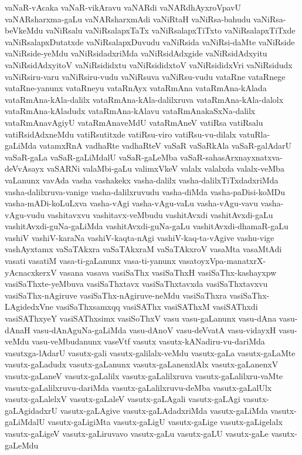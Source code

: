 {vaNaR-vAcaka
vaNaR-vikAravu
vaNARdi
vaNARdhAyxroVpavU
vaNARsharxma-gaLu
vaNARsharxmAdi
vaNiRtaH
vaNiRsa-bahudu
vaNiRsa-beVkeMdu
vaNiRsalu
vaNiRsalapxTaTx
vaNiRsalapxTiTxto
vaNiRsalapxTiTxde
vaNiRsalapxDutatxde
vaNiRsalapxDuvudu
vaNiRsida
vaNiRsi-daMte
vaNiRside
vaNiRside-yeMdu
vaNiRsidadxriMda
vaNiRsidAdxgide
vaNiRsidAdxyitu
vaNiRsidAdxyitoV
vaNiRsididxtu
vaNiRsididxtoV
vaNiRsididxVri
vaNiRsidudx
vaNiRsiru-varu
vaNiRsiru-vudu
vaNiRsuva
vaNiRsu-vudu
vataRne
vataRnege
vataRne-yanunx
vataRneyu
vataRnAyx
vataRmAna
vataRmAna-kAlada
vataRmAna-kAla-dalilx
vataRmAna-kAla-dalilxruva
vataRmAna-kAla-dalolx
vataRmAna-kAladudx
vataRmAna-kAlavu
vataRmAnakaSxNa-dalilx
vataRmAnavAgiyU
vataRmAnaveMdU
vataRmAneV
vatiRsa
vatiRsalu
vatiRsidAdxneMdu
vatiRsutitxde
vatiRsu-viro
vatiRsu-vu-dilalx
vatuRla-gaLiMda
vatamxRnA
vadhaRte
vadhaRteV
vaSaR
vaSaRkAla
vaSaR-galAdarU
vaSaR-gaLa
vaSaR-gaLiMdalU
vaSaR-gaLeMba
vaSaR-sahasArxnayxnatxva-deVvAsayx
vaSARNi
valaMbi-gaLu
valimxVkeV
valalx
valalxda
valalx-veMba
vaLanunx
vavAda
vasha
vashakekx
vasha-dalilx
vasha-dalilxTiTxdadxriMda
vasha-dalilxruva-vanige
vasha-dalilxruvudu
vasha-diMda
vasha-paDisi-koMDu
vasha-mADi-koLuLxva
vasha-vAgi
vasha-vAgu-vaLu
vasha-vAgu-vavu
vasha-vAgu-vudu
vashitavxvu
vashitavx-veMbudu
vashitAvxdi
vashitAvxdi-gaLu
vashitAvxdi-guNa-gaLiMda
vashitAvxdi-guNa-gaLu
vashitAvxdi-dhamaR-gaLu
vashiV
vashiV-karaNa
vashiV-kaqta-nAgi
vashiV-kaq-ta-vAgive
vashu-vige
vashAyxtamx
vaSaTAkxra
vaSaTAkxraM
vaSaTAkxroV
vasaMta
vasaMtAdi
vasati
vasatiM
vasa-ti-gaLanunx
vasa-ti-yanunx
vasatoyxVpa-manatxrX-yAcnacxkerxV
vasana
vasava
vasiSaThx
vasiSaThxH
vasiSaThx-kashayxpw
vasiSaThxte-yeMbuva
vasiSaThxtavx
vasiSaThxtavxda
vasiSaThxtavxvu
vasiSaThx-nAgiruve
vasiSaThx-nAgiruve-neMdu
vasiSaThxra
vasiSaThx-LAgidedxVne
vasiSaThxsamxqq
vasiSAThx
vasiSAThxM
vasiSAThxdi
vasiSAThxyeY
vasiSAThxsimx
vasiSoThxV
vasu
vasu-gaLanunx
vasu-dAna
vasu-dAnaH
vasu-dAnAguNa-gaLiMda
vasu-dAnoV
vasu-deVvatA
vasu-vidayxH
vasu-veMdu
vasu-veMbudanunx
vaseVtf
vasutx
vasutx-kANadiru-vu-dariMda
vasutxga-lAdarU
vasutx-gali
vasutx-galilalx-veMdu
vasutx-gaLa
vasutx-gaLaMte
vasutx-gaLadudx
vasutx-gaLanunx
vasutx-gaLanenxlAlx
vasutx-gaLanenxV
vasutx-gaLaneV
vasutx-gaLalilx
vasutx-gaLalilxruva
vasutx-gaLalilxru-vaMte
vasutx-gaLalilxruvu-dariMda
vasutx-gaLalilxruvu-deMba
vasutx-gaLalUlx
vasutx-gaLalelxV
vasutx-gaLaleV
vasutx-gaLAgali
vasutx-gaLAgi
vasutx-gaLAgidadxrU
vasutx-gaLAgive
vasutx-gaLAdadxriMda
vasutx-gaLiMda
vasutx-gaLiMdalU
vasutx-gaLigiMta
vasutx-gaLigU
vasutx-gaLige
vasutx-gaLigelalx
vasutx-gaLigeV
vasutx-gaLiruvavo
vasutx-gaLu
vasutx-gaLU
vasutx-gaLe
vasutx-gaLeMdu
}
